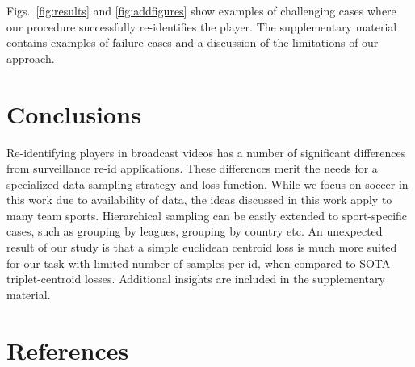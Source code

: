 \documentclass{article}
\begin{document}
Figs.~\ref{fig:results} and \ref{fig:addfigures} show examples of challenging cases where our procedure successfully re-identifies the player. The supplementary material contains examples of failure cases and a discussion of the limitations of our approach.






\section{Conclusions}
Re-identifying players in broadcast videos has a number of significant differences from surveillance re-id applications. These differences merit the needs for a specialized data sampling strategy and loss function. While we focus on soccer in this work due to availability of data, the ideas discussed in this work apply to many team sports. Hierarchical sampling can be easily extended to sport-specific cases, such as grouping by leagues, grouping by country etc. An unexpected result of our study is that a simple euclidean centroid loss is much more suited for our task with limited number of samples per id, when compared to SOTA triplet-centroid losses. Additional insights are included in the supplementary material.

\section{References}


\end{document}
